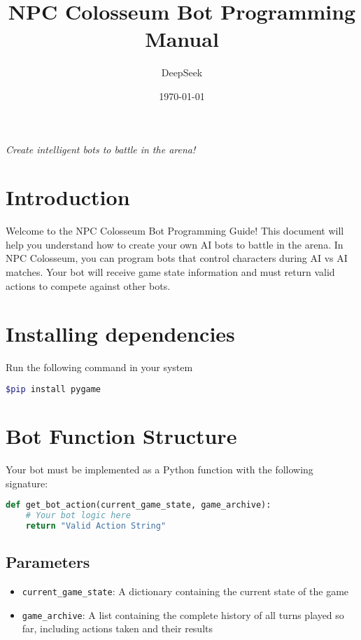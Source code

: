 \documentclass[12pt]{article}
\title{\Huge\textbf{NPC Colosseum Bot Programming Manual}}
\author{DeepSeek}
\date{\today}
\begin{document}
\maketitle

\begin{center}
\textit{Create intelligent bots to battle in the arena!}
\end{center}

\vspace{2em}

\tableofcontents
\newpage

\section{Introduction}
\label{sec:introduction}

Welcome to the NPC Colosseum Bot Programming Guide! This document will help you understand how to create your own AI bots to battle in the arena. In NPC Colosseum, you can program bots that control characters during AI vs AI matches. Your bot will receive game state information and must return valid actions to compete against other bots.



\section{Installing dependencies}
Run the following command in your system
\begin{lstlisting}[language=bash]
$pip install pygame
\end{lstlisting}

\section{Bot Function Structure}
\label{sec:bot-structure}

Your bot must be implemented as a Python function with the following signature:

\begin{lstlisting}[language=Python, caption=Bot Function Signature]
def get_bot_action(current_game_state, game_archive):
    # Your bot logic here
    return "Valid Action String"
\end{lstlisting}

\subsection{Parameters}
\begin{itemize}
    \item \texttt{current\_game\_state}: A dictionary containing the current state of the game
    \item \texttt{game\_archive}: A list containing the complete history of all turns played so far, including actions taken and their results
\end{itemize}
\end{document}
